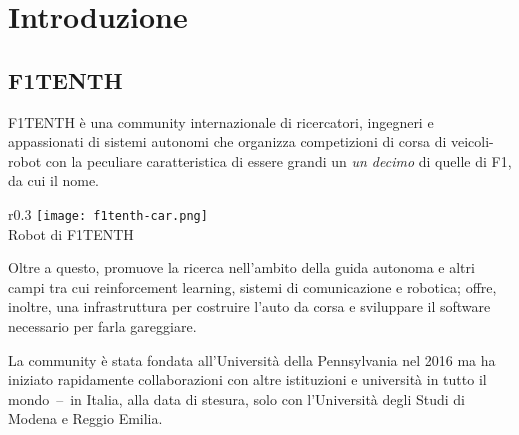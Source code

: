 
\chapter{Introduzione}
\label{chap:intro}


\section{F1TENTH}
F1TENTH è una community internazionale di ricercatori, ingegneri e appassionati di sistemi autonomi
che organizza competizioni di corsa di veicoli-robot con la peculiare caratteristica
di essere grandi un \textit{un decimo} di quelle di F1, da cui il nome.
\begin{wrapfigure}{r}{0.3\textwidth}
	\centering
	\texttt{[image: f1tenth-car.png]}
	{\footnotesize \\Robot di F1TENTH \cite{overview}}
\end{wrapfigure}
Oltre a questo, promuove la ricerca nell'ambito della guida autonoma
e altri campi tra cui reinforcement learning, sistemi di comunicazione e robotica;
offre, inoltre, una infrastruttura per costruire l'auto da corsa
e sviluppare il software necessario per farla gareggiare. \cite{f1tenth-web}

La community è stata fondata all'Università della Pennsylvania nel 2016 ma ha iniziato rapidamente
collaborazioni con altre istituzioni e università in tutto il mondo~--~in Italia, alla data di stesura, solo
con l'Università degli Studi di Modena e Reggio Emilia. \cite{f1tenth-about}

